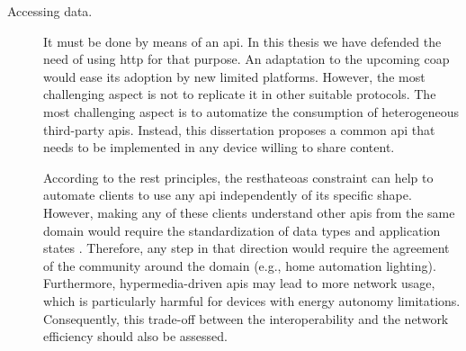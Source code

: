 \begin{description}
  \item[Accessing data.] It must be done by means of an \ac{api}.
			    In this thesis we have defended the need of using \ac{http} for that purpose.
			    An adaptation to the upcoming \ac{coap} would ease its adoption by new limited platforms. %
			    However, the most challenging aspect is not to replicate it in other suitable protocols.
			    The most challenging aspect is to automatize the consumption of heterogeneous third-party \acp{api}.
			    Instead, this dissertation proposes a common \ac{api} that needs to be implemented in any device willing to share content. %
			    
			    According to the \ac{rest} principles, the \ac{resthateoas} constraint can help to automate clients to use any \ac{api} independently of its specific shape. %
			    However, making any of these clients understand other \acp{api} from the same domain would require the standardization of data types and application states \citep{fielding_rest_2008}. %
			    Therefore, any step in that direction would require the agreement of the community around the domain (e.g., home automation lighting).
			    Furthermore, hypermedia-driven \acp{api} may lead to more network usage, which is particularly harmful for devices with energy autonomy limitations.
			    Consequently, this trade-off between the interoperability and the network efficiency should also be assessed.
			    
			    

\end{description}
